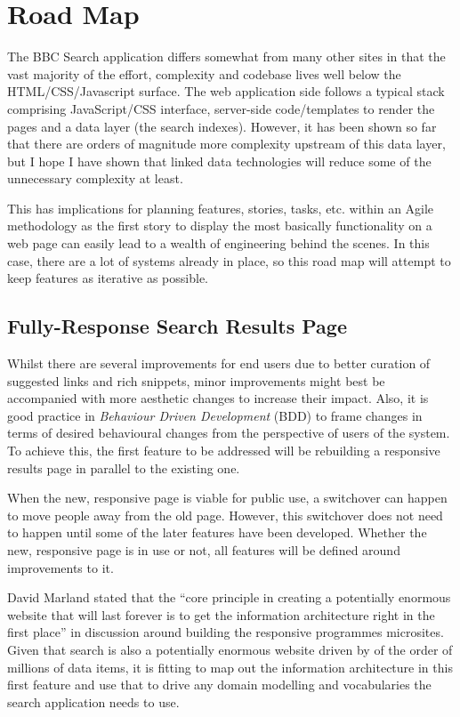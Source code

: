 \section{Road Map}

The BBC Search application differs somewhat from many other sites in that
the vast majority of the effort, complexity and codebase lives well
below the HTML/CSS/Javascript surface. The web application side follows
a typical stack comprising JavaScript/CSS interface, server-side code/templates
to render the pages and a data layer (the search indexes). However, it has been
shown so far that there are orders of magnitude more complexity upstream
of this data layer, but I hope I have shown that linked data technologies
will reduce some of the unnecessary complexity at least.

This has implications for planning features, stories, tasks, etc. within
an Agile methodology as the first story to display the most basically
functionality on a web page can easily lead to a wealth of engineering
behind the scenes. In this case, there are a lot of systems already in
place, so this road map will attempt to keep features as iterative as possible.

\subsection{Fully-Response Search Results Page}

Whilst there are several improvements for end users due to better
curation of suggested links and rich snippets, minor improvements
might best be accompanied with more aesthetic changes to increase
their impact. Also, it is good practice in \emph{Behaviour Driven Development}
(BDD) to frame changes in terms of desired behavioural changes from
the perspective of users of the system. To achieve this, the first
feature to be addressed will be rebuilding a responsive results
page in parallel to the existing one.

When the new, responsive page is viable for public use, a switchover
can happen to move people away from the old page. However, this
switchover does not need to happen until some of the later features
have been developed. Whether the new, responsive page is in
use or not, all features will be defined around improvements to
it.

David Marland stated that the ``core principle in creating a potentially
enormous website that will last forever is to get the information
architecture right in the first place'' in discussion around
building the responsive programmes microsites.\cite{marland2014responsive}
Given that
search is also a potentially enormous website driven by of the
order of millions of data items, it is fitting to map out the
information architecture in this first feature and use that to
drive any domain modelling and vocabularies the search application
needs to use.

